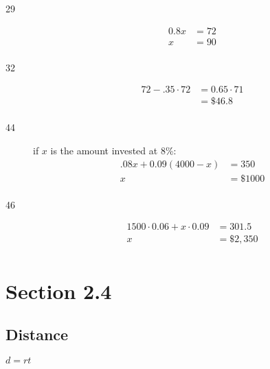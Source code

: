 \documentclass[letterpaper, landscape]{exam}
\begin{document}
  \begin{description}

    \item[29]
      \begin{align*}
        0.8x & = 72 \\
        x    & = \boxed{ 90 } \\
      \end{align*}

    \item[32]
      \begin{align*}
        72 - .35 \cdot 72 & = 0.65 \cdot 71 \\
                          & = \boxed{ \$46.8 } \\
      \end{align*}

    \item[44]
      if $x$ is the amount invested at 8\%:
      \begin{align*}
        .08x + 0.09(4000 - x) & = 350 \\
        x                     & = \boxed{ \$1000 } \\
      \end{align*}

    \item[46]
      \begin{align*}
        1500 \cdot 0.06 + x \cdot 0.09 & = 301.5 \\
        x                              & = \boxed{ \$2,350 } \\
      \end{align*}

  \end{description}

  \section{Section 2.4} %

  \subsection{Distance} %
  
  $d = rt$
\end{document}
